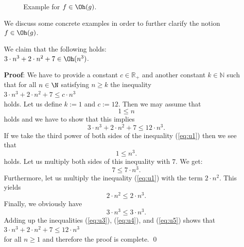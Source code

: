 \begin{figure}[!ht]
  \centering
  \caption{Example for $f \in \Oh(g)$.} 
  \label{fig:big-o.eps}
\end{figure}


\noindent
We discuss some concrete examples in order to further clarify the notion $f \in \Oh(g)$.

\example
We claim that the following holds:
\\[0.2cm]
\hspace*{1.3cm}
$3 \cdot n^3 + 2 \cdot n^2 + 7 \in \Oh(n^3)$. 
\ex

\noindent
\textbf{Proof}:  We have to  provide a constant $c\in\mathbb{R}_+$ and another constant $k\in\mathbb{N}$ such that for all $n\in
\N$ satisfying
$n \geq k$ the inequality
\\[0.2cm]
\hspace*{1.3cm} 
$3 \cdot n^3 + 2 \cdot n^2 + 7 \leq c \cdot n^3$
\\[0.2cm]
holds.  Let us define  $k := 1$ and $c := 12$.  Then we may assume that 
\begin{equation}
  \label{eq:u1}
  1\leq n  
\end{equation}
holds and we have to show that this implies 
\begin{equation}
  \label{eq:u2}
  3 \cdot n^3 + 2 \cdot n^2 + 7 \leq 12 \cdot n^3.
\end{equation}
If we take the third power of both sides of the inequality (\ref{eq:u1}) then we see that
\begin{equation}
  \label{eq:u3pre}
  1 \leq n^3.
\end{equation}
holds.  Let us multiply both sides of this inequality with $7$.  We get: 
\begin{equation}
  \label{eq:u3}
  7 \leq 7 \cdot n^3.
\end{equation}
Furthermore, let us multiply the inequality (\ref{eq:u1}) with the term $2\cdot n^2$.  This yields
\begin{equation}
  \label{eq:u4}
  2 \cdot n^2 \leq 2 \cdot n^3.
\end{equation}
Finally, we obviously have
\begin{equation}
  \label{eq:u5}
  3 \cdot n^3 \leq 3 \cdot n^3.
\end{equation}
Adding up the inequalities (\ref{eq:u3}), (\ref{eq:u4}), and (\ref{eq:u5}) shows that \\[0.2cm]
\hspace*{1.3cm} $3 \cdot n^3 + 2 \cdot n^2 + 7 \leq 12 \cdot n^3$ \\[0.2cm]
for all $n \geq 1$ and therefore the proof is complete. \qed


